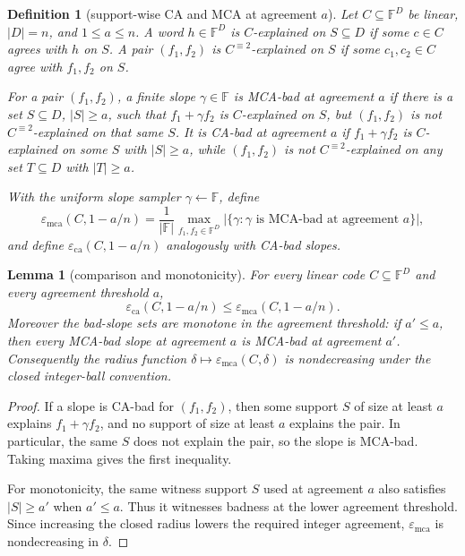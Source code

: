 \documentclass[a4paper,11pt]{amsart}
\newtheorem{lemma}[theorem]{Lemma}
\newtheorem{definition}[theorem]{Definition}
\theoremstyle{remark}
\newcommand{\F}{\mathbb F}
\newcommand{\emca}{\varepsilon_{\mathrm{mca}}}
\newcommand{\eca}{\varepsilon_{\mathrm{ca}}}
\begin{document}
\begin{definition}[support-wise CA and MCA at agreement \(a\)]\label{def:ca-mca}
Let \(C\subseteq\F^D\) be linear, \(|D|=n\), and \(1\le a\le n\).  A word \(h\in\F^D\) is \(C\)-explained on \(S\subseteq D\) if some \(c\in C\) agrees with \(h\) on \(S\).  A pair \((f_1,f_2)\) is \(C^{\equiv2}\)-explained on \(S\) if some \(c_1,c_2\in C\) agree with \(f_1,f_2\) on \(S\).

For a pair \((f_1,f_2)\), a finite slope \(\gamma\in\F\) is MCA-bad at agreement \(a\) if there is a set \(S\subseteq D\), \(|S|\ge a\), such that \(f_1+\gamma f_2\) is \(C\)-explained on \(S\), but \((f_1,f_2)\) is not \(C^{\equiv2}\)-explained on that same \(S\).  It is CA-bad at agreement \(a\) if \(f_1+\gamma f_2\) is \(C\)-explained on some \(S\) with \(|S|\ge a\), while \((f_1,f_2)\) is not \(C^{\equiv2}\)-explained on any set \(T\subseteq D\) with \(|T|\ge a\).

With the uniform slope sampler \(\gamma\leftarrow\F\), define
\[
        \emca(C,1-a/n)
        =
        \frac{1}{|\F|}
        \max_{f_1,f_2\in\F^D}
        |\{\gamma:\gamma\text{ is MCA-bad at agreement }a\}|,
\]
and define \(\eca(C,1-a/n)\) analogously with CA-bad slopes.
\end{definition}

\begin{lemma}[comparison and monotonicity]\label{lem:basic-staircase}
For every linear code \(C\subseteq\F^D\) and every agreement threshold \(a\),
\[
        \eca(C,1-a/n)\le \emca(C,1-a/n).
\]
Moreover the bad-slope sets are monotone in the agreement threshold: if \(a'\le a\), then every MCA-bad slope at agreement \(a\) is MCA-bad at agreement \(a'\).  Consequently the radius function \(\delta\mapsto\emca(C,\delta)\) is nondecreasing under the closed integer-ball convention.
\end{lemma}

\begin{proof}
If a slope is CA-bad for \((f_1,f_2)\), then some support \(S\) of size at least \(a\) explains \(f_1+\gamma f_2\), and no support of size at least \(a\) explains the pair.  In particular, the same \(S\) does not explain the pair, so the slope is MCA-bad.  Taking maxima gives the first inequality.

For monotonicity, the same witness support \(S\) used at agreement \(a\) also satisfies \(|S|\ge a'\) when \(a'\le a\).  Thus it witnesses badness at the lower agreement threshold.  Since increasing the closed radius lowers the required integer agreement, \(\emca\) is nondecreasing in \(\delta\).
\end{proof}
\end{document}
